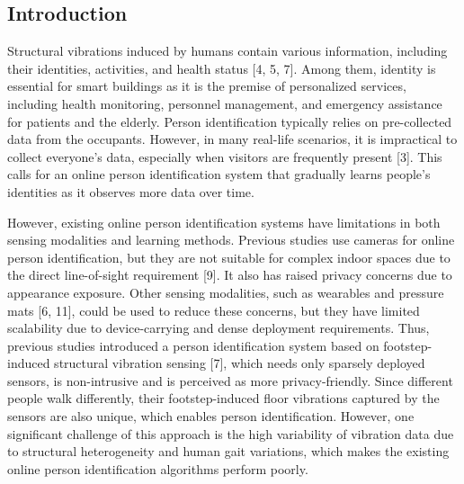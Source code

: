 \documentclass[11pt,letter]{article}
\begin{document}
\begin{multicols*}{2}

\section{Introduction}

Structural vibrations induced by humans contain various information, including their identities, activities, and health status [4, 5, 7]. Among them, identity is essential for smart buildings as it is the premise of personalized services, including health monitoring, personnel management, and emergency assistance for patients and the elderly. Person identification typically relies on pre-collected data from the occupants. However, in many real-life scenarios, it is impractical to collect everyone’s data, especially when visitors are frequently present [3]. This calls for an online person identification system that gradually learns people’s identities as it observes more data over time. 

However, existing online person identification systems have limitations in both sensing modalities and learning methods. Previous studies use cameras for online person identification, but they are not suitable for complex indoor spaces due to the direct line-of-sight requirement [9]. It also has raised privacy concerns due to appearance exposure. Other sensing modalities, such as wearables and pressure mats [6, 11], could be used to reduce these concerns, but they have limited scalability due to device-carrying and dense deployment requirements. Thus, previous studies introduced a person identification system based on footstep-induced structural vibration sensing [7], which needs only sparsely deployed sensors, is non-intrusive and is perceived as more privacy-friendly. Since different people walk differently, their footstep-induced floor vibrations captured by the sensors are also unique, which enables person identification. However, one significant challenge of this approach is the high variability of vibration data due to structural heterogeneity and human gait variations, which makes the existing online person identification algorithms perform poorly.


\end{multicols*}
\end{document}
